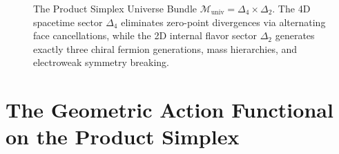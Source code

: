 \documentclass[11pt,reqno]{amsart}
\theoremstyle{definition}
\begin{document}
\begin{figure}[t]
{
}
\caption{The Product Simplex Universe Bundle $\mathcal{M}_{\mathrm{univ}} = \Delta_4 \times \Delta_2$. The 4D spacetime sector $\Delta_4$ eliminates zero-point divergences via alternating face cancellations, while the 2D internal flavor sector $\Delta_2$ generates exactly three chiral fermion generations, mass hierarchies, and electroweak symmetry breaking.}
\label{fig:product_simplex_universe}
\end{figure}

\section{The Geometric Action Functional on the Product Simplex}
\end{document}

